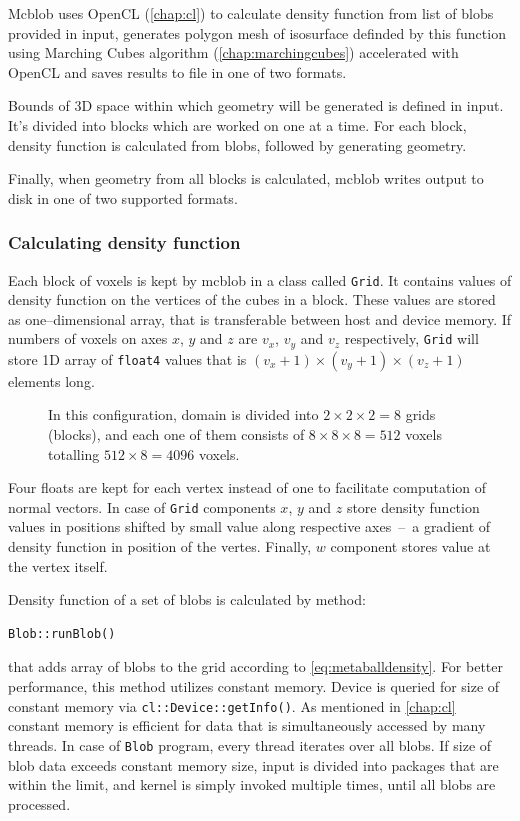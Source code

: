 Mcblob uses OpenCL (\autoref{chap:cl}) to calculate density function from
list of blobs provided in input, generates polygon mesh of isosurface
definded by this function using Marching Cubes algorithm (\autoref{chap:marchingcubes})
accelerated with OpenCL and saves results to file in one of two formats.

Bounds of 3D space within which geometry will be generated is defined in input.
It's divided into blocks which are worked on one at a time. For each block,
density function is calculated from blobs, followed by generating geometry.

Finally, when geometry from all blocks is calculated, mcblob writes output to
disk in one of two supported formats.

\subsubsection{Calculating density function}

Each block of voxels is kept by mcblob in a class called \texttt{Grid}. It
contains values of density function on the vertices of the cubes in a block.
These values are stored as one--dimensional array, that is transferable between host and
device memory. If numbers of voxels on axes $x$, $y$ and $z$ are $v_x$, $v_y$
and $v_z$ respectively, \texttt{Grid} will store 1D array
of \texttt{float4} values that is $(v_x+1)\times(v_y+1)\times(v_z+1)$ elements long.

\begin{figure}[tb]
  \begin{center}
    
  \end{center}
  \caption{In this configuration, domain is divided into $2\times2\times2=8$
  grids (blocks), and each one of them consists of $8\times8\times8=512$ voxels totalling
 $512\times8=4096$ voxels.}
  \label{fig:grid}
\end{figure}

Four floats are kept for each vertex instead of one to facilitate computation of
normal vectors. In case of \texttt{Grid} components $x$, $y$ and
$z$ store density function values in positions shifted by small value along
respective axes~--~a gradient of density function in position of the vertes.
Finally, $w$ component stores value at the vertex itself.

Density function of a set of blobs is calculated by method:
\begin{lstlisting}[numbers=none]
Blob::runBlob()
\end{lstlisting}
that adds array of blobs to the grid according to \autoref{eq:metaballdensity}.
For better performance, this method utilizes constant memory. Device is queried
for size of constant memory via \texttt{cl::Device::getInfo()}. As
mentioned in \autoref{chap:cl} constant memory is efficient for data that is
simultaneously accessed by many threads. In case of \texttt{Blob} program,
every thread iterates over all blobs. If size of blob data exceeds constant
memory size, input is divided into packages that are within the limit, and kernel
is simply invoked multiple times, until all blobs are processed.

